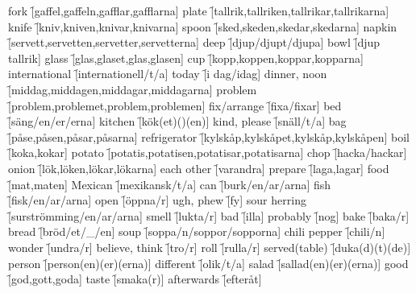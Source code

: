\begin{questions}
    \begin{multicols}{2}
        \raggedcolumns
        \question fork \f[gaffel,gaffeln,gafflar,gafflarna]
        \question plate \f[tallrik,tallriken,tallrikar,tallrikarna]
        \question knife \f[kniv,kniven,knivar,knivarna]
        \question spoon \f[sked,skeden,skedar,skedarna]
        \question napkin \f[servett,servetten,servetter,servetterna]
        \question deep \f[djup/djupt/djupa]
        \question bowl \f[djup tallrik]
        \question glass \f[glas,glaset,glas,glasen]
        \question cup \f[kopp,koppen,koppar,kopparna]
        \question international \f[internationell/t/a]
        \question today \f[i dag/idag]
        \question dinner, noon \f[middag,middagen,middagar,middagarna]
        \question problem \f[problem,problemet,problem,problemen]
        \question fix/arrange \f[fixa/fixar]
        \question bed \f[säng/en/er/erna]
        \question kitchen \f[kök(et)()(en)]
        \question kind, please \f[snäll/t/a]
        \question bag \f[påse,påsen,påsar,påsarna]
        \question refrigerator \f[kylskåp,kylskåpet,kylskåp,kylskåpen]
        \question boil \f[koka,kokar]
        \question potato \f[potatis,potatisen,potatisar,potatisarna]
        \question chop \f[hacka/hackar]
        \question onion \f[lök,löken,lökar,lökarna]
        \question each other \f[varandra]
        \question prepare \f[laga,lagar]
        \question food \f[mat,maten]
        \question Mexican \f[mexikansk/t/a]
        \question can \f[burk/en/ar/arna]
        \question fish \f[fisk/en/ar/arna]
        \question open \f[öppna/r]
        \question ugh, phew \f[fy]
        \question sour herring \f[surströmming/en/ar/arna]
        \question smell \f[lukta/r]
        \question bad \f[illa]
        \question probably \f[nog]
        \question bake \f[baka/r]
        \question bread \f[bröd/et/\_/en]
        \question soup \f[soppa/n/soppor/sopporna]
        \question chili pepper \f[chili/n]
        \question wonder \f[undra/r]
        \question believe, think \f[tro/r]
        \question roll \f[rulla/r]
        \question served(table) \f[duka(d)(t)(de)]
        \question person \f[person(en)(er)(erna)]
        \question different \f[olik/t/a]
        \question salad \f[sallad(en)(er)(erna)]
        \question good \f[god,gott,goda]
        \question taste \f[smaka(r)]
        \question afterwards \f[efteråt]
    \end{multicols}
\end{questions}
